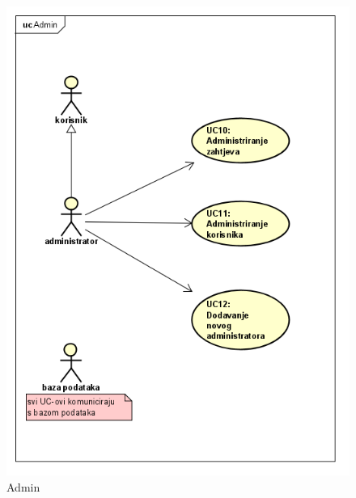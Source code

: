 					\begin{figure}[H]
					\includegraphics[scale=1.0]{slike/admin.png} %
					\centering
					\caption{Admin}
				\end{figure}
				\newpage
				
